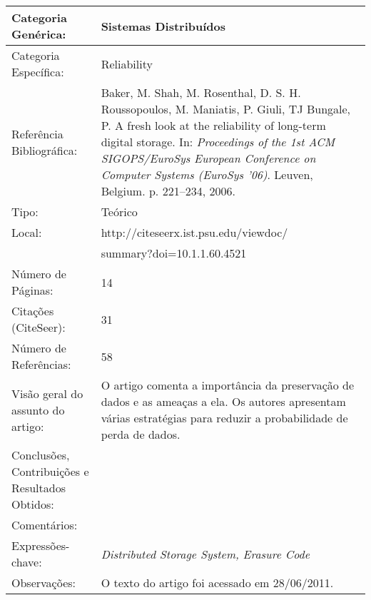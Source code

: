 \documentclass[10pt,a4paper]{article}
\begin{document}
\begin{center}
\begin{tabular}{|p{5cm}||p{10cm}|}
\hline

Categoria Genérica: & Sistemas Distribuídos\\\hline
Categoria Específica: & Reliability\\\hline
Referência Bibliográfica: & Baker, M. Shah, M. Rosenthal, D. S. H.  Roussopoulos, M. Maniatis, P. Giuli, TJ Bungale, P. A fresh look at the reliability of long-term digital storage. In:  \emph{Proceedings of the 1st ACM SIGOPS/EuroSys European Conference on Computer Systems (EuroSys '06)}. Leuven, Belgium. p. 221--234, 2006.\\\hline
Tipo: & Teórico\\\hline
Local: & http://citeseerx.ist.psu.edu/viewdoc/\\ &summary?doi=10.1.1.60.4521\\\hline
Número de Páginas: & 14\\\hline
Citações (CiteSeer): & 31\\\hline
Número de Referências: & 58\\\hline
Visão geral do assunto do artigo: & O artigo comenta a importância da preservação de dados e as ameaças a ela. Os autores apresentam várias estratégias para reduzir a probabilidade de perda de dados.\\\hline
Conclusões, Contribuições e Resultados Obtidos: & \\\hline
Comentários: & \\\hline
Expressões-chave: & \emph{Distributed Storage System, Erasure Code}\\\hline
Observações: & O texto do artigo foi acessado em 28/06/2011.\\\hline

\end{tabular}
\end{center}
\end{document}
